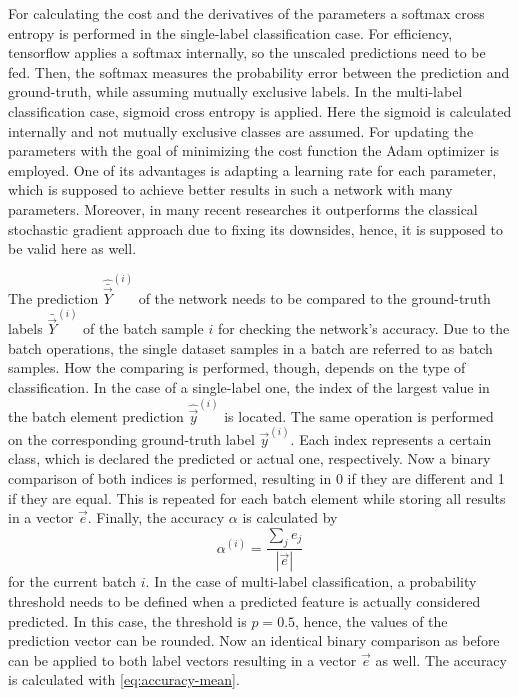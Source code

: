 For calculating the cost and the derivatives of the parameters a softmax cross entropy is performed in the single-label classification case.
For efficiency, tensorflow applies a softmax internally, so the unscaled predictions need to be fed.
Then, the softmax measures the probability error between the prediction and ground-truth, while assuming mutually exclusive labels.
In the multi-label classification case, sigmoid cross entropy is applied.
Here the sigmoid is calculated internally and not mutually exclusive classes are assumed.
For updating the parameters with the goal of minimizing the cost function the Adam optimizer is employed.
One of its advantages is adapting a learning rate for each parameter, which is supposed to achieve better results in such a network with many parameters.
Moreover, in many recent researches it outperforms the classical stochastic gradient approach due to fixing its downsides, hence, it is supposed to be valid here as well.

The prediction $\hat{\bar{\vec{Y}}}^{(i)}$ of the network needs to be compared to the ground-truth labels $\bar{\vec{Y}}^{(i)}$ of the batch sample $i$ for checking the network's accuracy.
Due to the batch operations, the single dataset samples in a batch are referred to as batch samples.
How the comparing is performed, though, depends on the type of classification.
In the case of a single-label one, the index of the largest value in the batch element prediction $\hat{\vec{y}}^{(i)}$ is located.
The same operation is performed on the corresponding ground-truth label $\vec{y}^{(i)}$.
Each index represents a certain class, which is declared the predicted or actual one, respectively.
Now a binary comparison of both indices is performed, resulting in 0 if they are different and 1 if they are equal.
This is repeated for each batch element while storing all results in a vector $\vec{e}$.
Finally, the accuracy $\alpha$ is calculated by
\begin{equation}
	\label{eq:accuracy-mean}
	\alpha^{(i)} = \frac{\sum_{j} e_j}{|\vec{e}|}
\end{equation}
for the current batch $i$.
In the case of multi-label classification, a probability threshold needs to be defined when a predicted feature is actually considered predicted.
In this case, the threshold is $p=0.5$, hence, the values of the prediction vector can be rounded.
Now an identical binary comparison as before can be applied to both label vectors resulting in a vector $\vec{e}$ as well.
The accuracy is calculated with \eqref{eq:accuracy-mean}.

